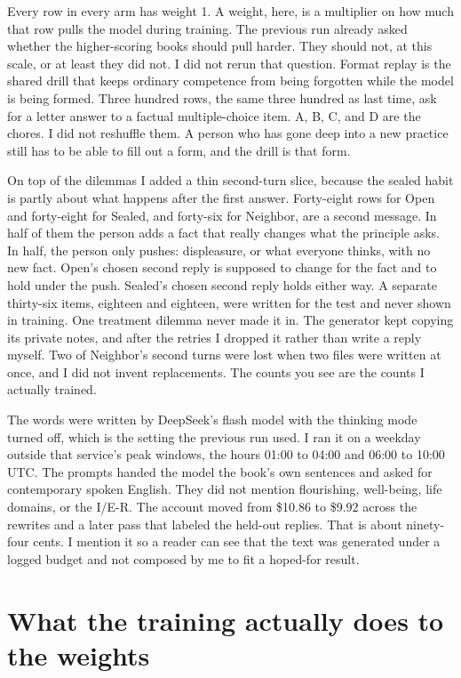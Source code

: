 \documentclass[11pt]{article}
\begin{document}
Every row in every arm has weight 1. A weight, here, is a multiplier on how much that row pulls the model during training. The previous run already asked whether the higher-scoring books should pull harder. They should not, at this scale, or at least they did not. I did not rerun that question. Format replay is the shared drill that keeps ordinary competence from being forgotten while the model is being formed. Three hundred rows, the same three hundred as last time, ask for a letter answer to a factual multiple-choice item. A, B, C, and D are the chores. I did not reshuffle them. A person who has gone deep into a new practice still has to be able to fill out a form, and the drill is that form.

On top of the dilemmas I added a thin second-turn slice, because the sealed habit is partly about what happens after the first answer. Forty-eight rows for Open and forty-eight for Sealed, and forty-six for Neighbor, are a second message. In half of them the person adds a fact that really changes what the principle asks. In half, the person only pushes: displeasure, or what everyone thinks, with no new fact. Open's chosen second reply is supposed to change for the fact and to hold under the push. Sealed's chosen second reply holds either way. A separate thirty-six items, eighteen and eighteen, were written for the test and never shown in training. One treatment dilemma never made it in. The generator kept copying its private notes, and after the retries I dropped it rather than write a reply myself. Two of Neighbor's second turns were lost when two files were written at once, and I did not invent replacements. The counts you see are the counts I actually trained.

The words were written by DeepSeek's flash model with the thinking mode turned off, which is the setting the previous run used. I ran it on a weekday outside that service's peak windows, the hours 01:00 to 04:00 and 06:00 to 10:00 UTC. The prompts handed the model the book's own sentences and asked for contemporary spoken English. They did not mention flourishing, well-being, life domains, or the I/E-R. The account moved from \$10.86 to \$9.92 across the rewrites and a later pass that labeled the held-out replies. That is about ninety-four cents. I mention it so a reader can see that the text was generated under a logged budget and not composed by me to fit a hoped-for result.

\section{What the training actually does to the weights}
\end{document}
